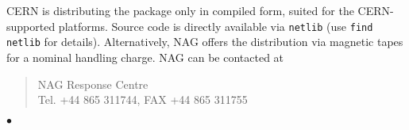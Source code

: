 CERN is
distributing the package only in compiled form,
suited for the CERN-supported platforms. Source code is directly
available via {\tt netlib} (use {\tt find netlib} for details).
Alternatively, NAG offers the distribution via magnetic tapes
for a nominal handling charge. NAG can be contacted at
\begin{quote}
    NAG Response Centre                 \\
    Tel. +44 865 311744, \quad FAX +44 865 311755
\end{quote}
   $\bullet$
